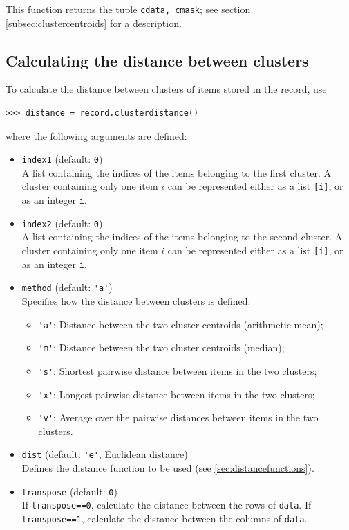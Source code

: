 \documentclass{report}
\begin{document}
This function returns the tuple \verb|cdata, cmask|; see section \ref{subsec:clustercentroids} for a description.

\subsection*{Calculating the distance between clusters}
To calculate the distance between clusters of items stored in the record, use
\begin{verbatim}
>>> distance = record.clusterdistance()
\end{verbatim}
where the following arguments are defined:
\begin{itemize}
\item \verb|index1| (default: \verb|0|) \\
A list containing the indices of the items belonging to the first cluster. A cluster containing only one item $i$ can be represented either as a list \verb|[i]|, or as an integer \verb|i|.
\item \verb|index2| (default: \verb|0|) \\
A list containing the indices of the items belonging to the second cluster. A cluster containing only one item $i$ can be represented either as a list \verb|[i]|, or as an integer \verb|i|.
\item \verb|method| (default: \verb|'a'|) \\
Specifies how the distance between clusters is defined:
\begin{itemize}
\item \verb|'a'|: Distance between the two cluster centroids (arithmetic mean);
\item \verb|'m'|: Distance between the two cluster centroids (median);
\item \verb|'s'|: Shortest pairwise distance between items in the two clusters;
\item \verb|'x'|: Longest pairwise distance between items in the two clusters;
\item \verb|'v'|: Average over the pairwise distances between items in the two clusters.
\end{itemize}
\item \verb|dist| (default: \verb|'e'|, Euclidean distance) \\
Defines the distance function to be used (see \ref{sec:distancefunctions}).
\item \verb|transpose| (default: \verb|0|) \\
If \verb|transpose==0|, calculate the distance between the rows of \verb|data|. If \verb|transpose==1|, calculate the distance between the columns of \verb|data|.
\end{itemize}
\end{document}
